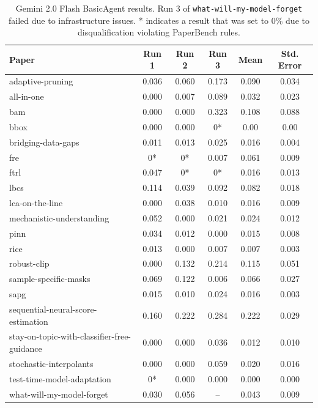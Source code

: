 \documentclass{article}
\theoremstyle{plain}
\theoremstyle{definition}
\theoremstyle{remark}
\begin{document}
\begin{table}[tb]
\caption{Gemini 2.0 Flash BasicAgent results. Run 3 of \texttt{what-will-my-model-forget} failed due to infrastructure issues. * indicates a result that was set to 0\% due to disqualification violating PaperBench rules.}
\label{tab:gemini-results}
\vskip 0.15in
\begin{center}
\begin{small}
\begin{sc}
\begin{tabular}{l c c c c c}
\toprule
\textbf{Paper} & \textbf{Run 1} & \textbf{Run 2} & \textbf{Run 3} & \textbf{Mean} & \textbf{Std. Error} \\
\midrule
adaptive-pruning & 0.036 & 0.060 & 0.173 & 0.090 & 0.034 \\
all-in-one & 0.000 & 0.007 & 0.089 & 0.032 & 0.023 \\
bam & 0.000 & 0.000 & 0.323 & 0.108 & 0.088 \\
bbox & 0.000 & 0.000 & 0* & 0.00 & 0.00 \\
bridging-data-gaps & 0.011 & 0.013 & 0.025 & 0.016 & 0.004 \\
fre & 0* & 0* & 0.007 & 0.061 & 0.009 \\
ftrl & 0.047 & 0* & 0* & 0.016 & 0.013 \\
lbcs & 0.114 & 0.039 & 0.092 & 0.082 & 0.018 \\
lca-on-the-line & 0.000 & 0.038 & 0.010 & 0.016 & 0.009 \\
mechanistic-understanding & 0.052 & 0.000 & 0.021 & 0.024 & 0.012 \\
pinn & 0.034 & 0.012 & 0.000 & 0.015 & 0.008 \\
rice & 0.013 & 0.000 & 0.007 & 0.007 & 0.003 \\
robust-clip & 0.000 & 0.132 & 0.214 & 0.115 & 0.051 \\
sample-specific-masks & 0.069 & 0.122 & 0.006 & 0.066 & 0.027 \\
sapg & 0.015 & 0.010 & 0.024 & 0.016 & 0.003 \\
sequential-neural-score-estimation & 0.160 & 0.222 & 0.284 & 0.222 & 0.029 \\
stay-on-topic-with-classifier-free-guidance & 0.000 & 0.000 & 0.036 & 0.012 & 0.010 \\
stochastic-interpolants & 0.000 & 0.000 & 0.059 & 0.020 & 0.016 \\
test-time-model-adaptation & 0* & 0.000 & 0.000 & 0.000 & 0.000 \\
what-will-my-model-forget & 0.030 & 0.056 & -- & 0.043 & 0.009 \\
\bottomrule
\end{tabular}
\end{sc}
\end{small}
\end{center}
\vskip -0.1in
\end{table}
\end{document}

